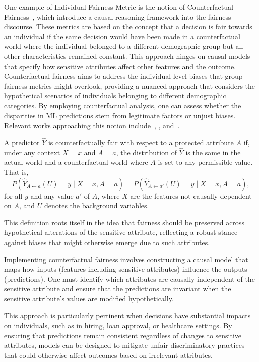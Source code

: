 One example of Individual Fairness Metric is the notion of Counterfactual Fairness~\citep{Kusner2018}, which introduce a causal reasoning framework into the fairness discourse. These metrics are based on the concept that a decision is fair towards an individual if the same decision would have been made in a counterfactual world where the individual belonged to a different demographic group but all other characteristics remained constant. This approach hinges on causal models that specify how sensitive attributes affect other features and the outcome. Counterfactual fairness aims to address the individual-level biases that group fairness metrics might overlook, providing a nuanced approach that considers the hypothetical scenarios of individuals belonging to different demographic categories. By employing counterfactual analysis, one can assess whether the disparities in ML predictions stem from legitimate factors or unjust biases. Relevant works approaching this notion include~\citet{Wu2022}, \citet{Yuchen2023}, and~\citet{GrariLD23}.

\begin{definition}\label{def:counterfactual_fairness}
A predictor $\hat{Y}$ is counterfactually fair with respect to a protected attribute $A$ if, under any context $X = x$ and $A = a$, the distribution of $\hat{Y}$ is the same in the actual world and a counterfactual world where $A$ is set to any permissible value. That is,
$$
P(\hat{Y}_{A \leftarrow a}(U) = y \mid X = x, A = a) = P(\hat{Y}_{A \leftarrow a'}(U) = y \mid X = x, A = a),
$$
for all $y$ and any value $a'$ of $A$, where $X$ are the features not causally dependent on $A$, and $U$ denotes the background variables.
\end{definition}

This definition roots itself in the idea that fairness should be preserved across hypothetical alterations of the sensitive attribute, reflecting a robust stance against biases that might otherwise emerge due to such attributes.

Implementing counterfactual fairness involves constructing a causal model that maps how inputs (features including sensitive attributes) influence the outputs (predictions). One must identify which attributes are causally independent of the sensitive attribute and ensure that the predictions are invariant when the sensitive attribute's values are modified hypothetically.

This approach is particularly pertinent when decisions have substantial impacts on individuals, such as in hiring, loan approval, or healthcare settings. By ensuring that predictions remain consistent regardless of changes to sensitive attributes, models can be designed to mitigate unfair discriminatory practices that could otherwise affect outcomes based on irrelevant attributes.

